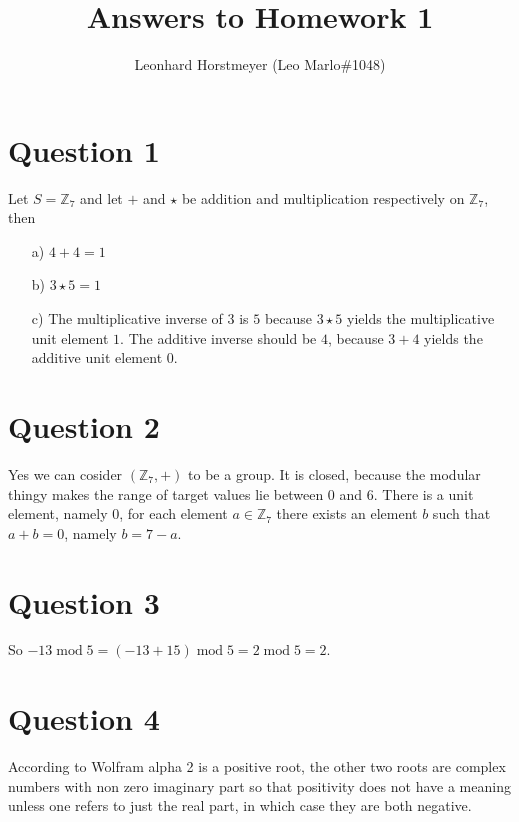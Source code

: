 \documentclass[a4paper,10pt]{article}
\title{Answers to Homework 1}
\author{Leonhard Horstmeyer (Leo Marlo\#1048)}
\begin{document}
\maketitle

\section*{Question 1}
Let $S=\mathbb Z_7$ and let $+$ and $\star$ be addition and multiplication respectively on $\mathbb Z_7$, then
\begin{itemize}
 \item[a)] $4+4=1$
 \item[b)] $3\star 5=1$
 \item[c)] The multiplicative inverse of $3$ is $5$ because $3\star 5$ yields the multiplicative unit element $1$. The additive inverse should be $4$, because $3+4$ yields the additive unit element $0$.
\end{itemize}

\section*{Question 2}
Yes we can cosider $(\mathbb Z_7, +)$ to be a group. It is closed, because the modular thingy makes the range of target values lie between $0$ and $6$. There is a unit element, namely $0$, for each element $a\in \mathbb Z_7$ there exists an element $b$ such that $a+b=0$, namely $b=7-a$. 

\section*{Question 3}
So $-13\;\text{mod}\;5 = (-13 + 15)\;\text{mod}\;5 = 2\;\text{mod}\;5= 2$.

\section*{Question 4}
According to Wolfram alpha 2 is a positive root, the other two roots are complex numbers with non zero imaginary part so that positivity does not have a meaning unless one refers to just the real part, in which case they are both negative.
\end{document}
